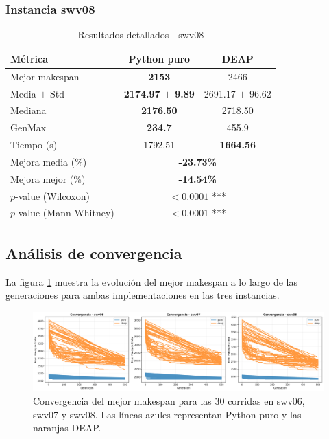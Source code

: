 \documentclass[12pt,a4paper]{article}
\begin{document}
\subsubsection{Instancia swv08}

\begin{table}[H]
\centering
\caption{Resultados detallados - swv08}
\label{tab:swv08}
\begin{tabular}{@{}lcc@{}}
\toprule
\textbf{Métrica} & \textbf{Python puro} & \textbf{DEAP} \\ \midrule
Mejor makespan & \textbf{2153} & 2466 \\
Media $\pm$ Std & \textbf{2174.97 $\pm$ 9.89} & 2691.17 $\pm$ 96.62 \\
Mediana & \textbf{2176.50} & 2718.50 \\
GenMax & \textbf{234.7} & 455.9 \\
Tiempo (s) & 1792.51 & \textbf{1664.56} \\ \midrule
Mejora media (\%) & \multicolumn{2}{c}{\textbf{-23.73\%}} \\
Mejora mejor (\%) & \multicolumn{2}{c}{\textbf{-14.54\%}} \\
$p$-value (Wilcoxon) & \multicolumn{2}{c}{$< 0.0001$ ***} \\
$p$-value (Mann-Whitney) & \multicolumn{2}{c}{$< 0.0001$ ***} \\
\bottomrule
\end{tabular}
\end{table}

\subsection{Análisis de convergencia}

La figura \ref{fig:convergencia} muestra la evolución del mejor makespan a lo largo de las generaciones para ambas implementaciones en las tres instancias.

\begin{figure}[H]
    \centering
    \includegraphics[width=\textwidth]{Figuras/convergencia_comparativa.png}
    \caption{Convergencia del mejor makespan para las 30 corridas en swv06, swv07 y swv08. Las líneas azules representan Python puro y las naranjas DEAP.}
    \label{fig:convergencia}
\end{figure}
\end{document}
